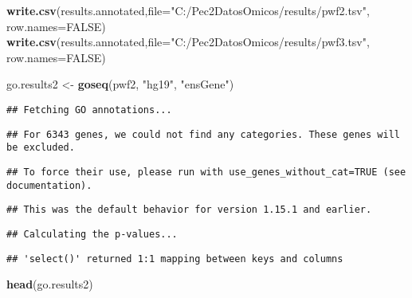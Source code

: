 \documentclass[
]{article}
\newenvironment{Shaded}{\begin{snugshade}}{\end{snugshade}}
\newcommand{\DataTypeTok}[1]{\textcolor[rgb]{0.13,0.29,0.53}{#1}}
\newcommand{\KeywordTok}[1]{\textcolor[rgb]{0.13,0.29,0.53}{\textbf{#1}}}
\newcommand{\NormalTok}[1]{#1}
\newcommand{\OtherTok}[1]{\textcolor[rgb]{0.56,0.35,0.01}{#1}}
\newcommand{\StringTok}[1]{\textcolor[rgb]{0.31,0.60,0.02}{#1}}
\begin{document}
\begin{Shaded}
\begin{Highlighting}[]
\KeywordTok{write.csv}\NormalTok{(results.annotated,}\DataTypeTok{file=}\StringTok{"C:/Pec2DatosOmicos/results/pwf2.tsv"}\NormalTok{,}
          \DataTypeTok{row.names=}\OtherTok{FALSE}\NormalTok{)}
\KeywordTok{write.csv}\NormalTok{(results.annotated,}\DataTypeTok{file=}\StringTok{"C:/Pec2DatosOmicos/results/pwf3.tsv"}\NormalTok{,}
          \DataTypeTok{row.names=}\OtherTok{FALSE}\NormalTok{)}
\end{Highlighting}
\end{Shaded}

\begin{Shaded}
\begin{Highlighting}[]
\NormalTok{go.results2 <-}\StringTok{ }\KeywordTok{goseq}\NormalTok{(pwf2, }\StringTok{"hg19"}\NormalTok{, }\StringTok{"ensGene"}\NormalTok{)}
\end{Highlighting}
\end{Shaded}

\begin{verbatim}
## Fetching GO annotations...
\end{verbatim}

\begin{verbatim}
## For 6343 genes, we could not find any categories. These genes will be excluded.
\end{verbatim}

\begin{verbatim}
## To force their use, please run with use_genes_without_cat=TRUE (see documentation).
\end{verbatim}

\begin{verbatim}
## This was the default behavior for version 1.15.1 and earlier.
\end{verbatim}

\begin{verbatim}
## Calculating the p-values...
\end{verbatim}

\begin{verbatim}
## 'select()' returned 1:1 mapping between keys and columns
\end{verbatim}

\begin{Shaded}
\begin{Highlighting}[]
\KeywordTok{head}\NormalTok{(go.results2)}
\end{Highlighting}
\end{Shaded}
\end{document}
